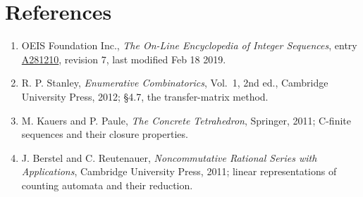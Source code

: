 \documentclass[11pt]{article}
\theoremstyle{definition}
\begin{document}
\section{References}

\begin{enumerate}

\item OEIS Foundation Inc., \emph{The On-Line Encyclopedia of Integer Sequences}, entry \href{https://oeis.org/A281210}{A281210}, revision 7, last modified Feb 18 2019.

\item R. P. Stanley, \emph{Enumerative Combinatorics}, Vol.~1, 2nd ed., Cambridge University Press, 2012; \S4.7, the transfer-matrix method.

\item M. Kauers and P. Paule, \emph{The Concrete Tetrahedron}, Springer, 2011; C-finite sequences and their closure properties.

\item J. Berstel and C. Reutenauer, \emph{Noncommutative Rational Series with Applications}, Cambridge University Press, 2011; linear representations of counting automata and their reduction.

\end{enumerate}
\end{document}

